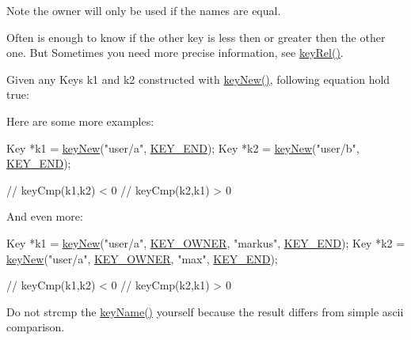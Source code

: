 \begin{DoxyNote}{Note}
the owner will only be used if the names are equal.
\end{DoxyNote}
Often is enough to know if the other key is less then or greater then the other one. But Sometimes you need more precise information, see \hyperlink{group__keytest_ga6bb0f95ac34ce9c42d61bb35a76139d0}{key\-Rel()}.

Given any Keys k1 and k2 constructed with \hyperlink{group__key_gad23c65b44bf48d773759e1f9a4d43b89}{key\-New()}, following equation hold true\-:


\begin{DoxyCodeInclude}
\end{DoxyCodeInclude}
 Here are some more examples\-: 
\begin{DoxyCode}
Key *k1 = \hyperlink{group__key_gad23c65b44bf48d773759e1f9a4d43b89}{keyNew}(\textcolor{stringliteral}{"user/a"}, \hyperlink{group__key_gga91fb3178848bd682000958089abbaf40aa8adb6fcb92dec58fb19410eacfdd403}{KEY\_END});
Key *k2 = \hyperlink{group__key_gad23c65b44bf48d773759e1f9a4d43b89}{keyNew}(\textcolor{stringliteral}{"user/b"}, \hyperlink{group__key_gga91fb3178848bd682000958089abbaf40aa8adb6fcb92dec58fb19410eacfdd403}{KEY\_END});

\textcolor{comment}{// keyCmp(k1,k2) < 0}
\textcolor{comment}{// keyCmp(k2,k1) > 0}
\end{DoxyCode}


And even more\-: 
\begin{DoxyCode}
Key *k1 = \hyperlink{group__key_gad23c65b44bf48d773759e1f9a4d43b89}{keyNew}(\textcolor{stringliteral}{"user/a"}, \hyperlink{group__key_gga91fb3178848bd682000958089abbaf40a77ca60362fa8daca8d5347db4385068b}{KEY\_OWNER}, \textcolor{stringliteral}{"markus"}, \hyperlink{group__key_gga91fb3178848bd682000958089abbaf40aa8adb6fcb92dec58fb19410eacfdd403}{KEY\_END});
Key *k2 = \hyperlink{group__key_gad23c65b44bf48d773759e1f9a4d43b89}{keyNew}(\textcolor{stringliteral}{"user/a"}, \hyperlink{group__key_gga91fb3178848bd682000958089abbaf40a77ca60362fa8daca8d5347db4385068b}{KEY\_OWNER}, \textcolor{stringliteral}{"max"}, \hyperlink{group__key_gga91fb3178848bd682000958089abbaf40aa8adb6fcb92dec58fb19410eacfdd403}{KEY\_END});

\textcolor{comment}{// keyCmp(k1,k2) < 0}
\textcolor{comment}{// keyCmp(k2,k1) > 0}
\end{DoxyCode}


Do not strcmp the \hyperlink{group__keyname_ga8e805c726a60da921d3736cda7813513}{key\-Name()} yourself because the result differs from simple ascii comparison.


